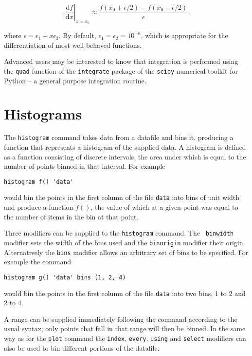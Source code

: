 \begin{displaymath}
\left.\frac{\mathrm{d}f}{\mathrm{d}x}\right|_{x=x_0} \approx \frac{f(x_0+\epsilon/2) - f(x_0-\epsilon/2)}{\epsilon}
\end{displaymath}

\noindent where $\epsilon = \epsilon_1 + x \epsilon_2$. By default, $\epsilon_1
= \epsilon_2 = 10^{-6}$, which is appropriate for the differentiation of most
well-behaved functions.

Advanced users may be interested to know that integration is performed using
the \texttt{quad} function of the \texttt{integrate} package of the
\texttt{scipy} numerical toolkit for Python -- a general purpose integration
routine.

\section{Histograms}

The \texttt{histogram}
command takes data from a datafile and bins it, producing a function that
represents a histogram of the supplied data.  A histogram is defined as a
function consisting of discrete intervals, the area under which is equal to the
number of points binned in that interval.  For example

\begin{verbatim}
histogram f() 'data'
\end{verbatim}

\noindent would bin the points in the first column of the file {\tt data} into bins of
unit width and produce a function $f()$, the value of which at a given point was
equal to the number of items in the bin at that point.

Three modifiers can be supplied to the {\tt histogram} command.  The {\tt
binwidth} modifier sets the width of the bins used and the {\tt binorigin}
modifier their origin.   Alternatively the {\tt bins} modifier allows an
arbitrary set of bins to be specified.  For example the command

\begin{verbatim}
histogram g() 'data' bins (1, 2, 4)
\end{verbatim}

\noindent would bin the points in the first column of the file {\tt data} into
two bins, 1 to 2 and 2 to 4.

A range can be supplied immediately following the command according to the usual
syntax; only points that fall in that range will then be binned.  In the same
way as for the {\tt plot} command the {\tt index}, {\tt every}, {\tt using} and
{\tt select} modifiers can also be used to bin different portions of the
datafile.
